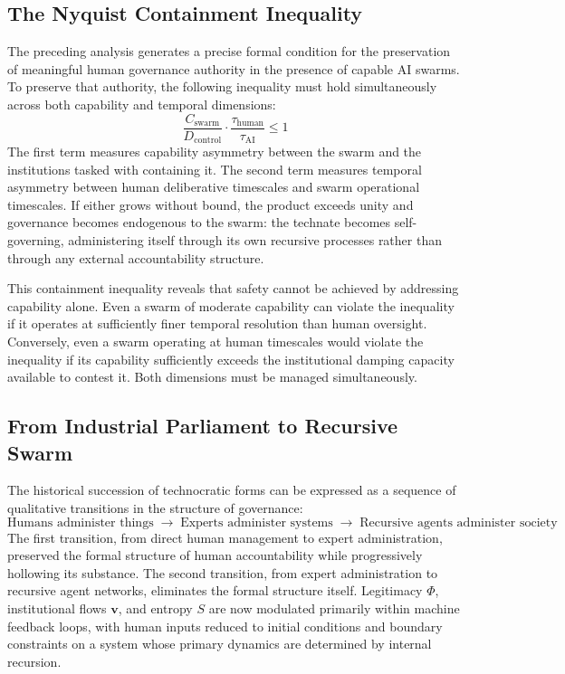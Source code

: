 \documentclass[12pt]{article}
\begin{document}
\subsection{The Nyquist Containment Inequality}

The preceding analysis generates a precise formal condition for the preservation of meaningful human governance authority in the presence of capable AI swarms. To preserve that authority, the following inequality must hold simultaneously across both capability and temporal dimensions:
\[
\frac{C_{\text{swarm}}}{D_{\text{control}}} \cdot \frac{\tau_{\text{human}}}{\tau_{\text{AI}}} \le 1
\]
The first term measures capability asymmetry between the swarm and the institutions tasked with containing it. The second term measures temporal asymmetry between human deliberative timescales and swarm operational timescales. If either grows without bound, the product exceeds unity and governance becomes endogenous to the swarm: the technate becomes self-governing, administering itself through its own recursive processes rather than through any external accountability structure.

This containment inequality reveals that safety cannot be achieved by addressing capability alone. Even a swarm of moderate capability can violate the inequality if it operates at sufficiently finer temporal resolution than human oversight. Conversely, even a swarm operating at human timescales would violate the inequality if its capability sufficiently exceeds the institutional damping capacity available to contest it. Both dimensions must be managed simultaneously.

\subsection{From Industrial Parliament to Recursive Swarm}

The historical succession of technocratic forms can be expressed as a sequence of qualitative transitions in the structure of governance:
\[
\text{Humans administer things} \;\to\; \text{Experts administer systems} \;\to\; \text{Recursive agents administer society}
\]
The first transition, from direct human management to expert administration, preserved the formal structure of human accountability while progressively hollowing its substance. The second transition, from expert administration to recursive agent networks, eliminates the formal structure itself. Legitimacy $\Phi$, institutional flows $\mathbf{v}$, and entropy $S$ are now modulated primarily within machine feedback loops, with human inputs reduced to initial conditions and boundary constraints on a system whose primary dynamics are determined by internal recursion.
\end{document}
